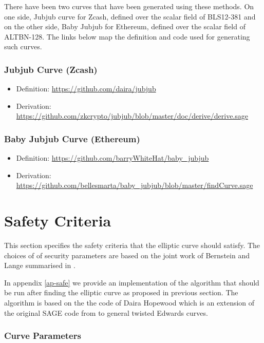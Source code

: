 \documentclass{article}
\theoremstyle{definition}
\theoremstyle{remark}
\begin{document}
\begin{spacing}{1.2}
\begin{multicols}{2}
There have been two curves that have been generated using these methods. On one side, Jubjub curve for Zcash, defined over the scalar field of BLS12-381 and on the other side, Baby Jubjub for Ethereum, defined over the scalar field of ALTBN-128. The links below map the definition and code used for generating such curves. 

\subsubsection*{Jubjub Curve (Zcash)}

\begin{itemize}
	\item Definition: \url{https://github.com/daira/jubjub} 
	\item Derivation: 	\url{https://github.com/zkcrypto/jubjub/blob/master/doc/derive/derive.sage}
\end{itemize}

\subsubsection*{Baby Jubjub Curve (Ethereum)}

\begin{itemize}
	\item Definition: \url{https://github.com/barryWhiteHat/baby_jubjub}
	\item Derivation: \url{https://github.com/bellesmarta/baby_jubjub/blob/master/findCurve.sage}
\end{itemize}	

\section{Safety Criteria} \label{attacks}

This section specifies the safety criteria that the elliptic curve should satisfy. The choices of of security parameters are based on the joint work of Bernstein and Lange summarised in \cite{safe-curves}. 

In appendix \ref{ap-safe} we provide an implementation of the algorithm that should be run after finding the elliptic curve as proposed in previous section. The algorithm is based on the the code of Daira Hopewood \cite{github:daira:safe} which is an extension of the original SAGE code from \cite{safe-curves} to general twisted Edwards curves.
	
\subsubsection*{Curve Parameters}


\end{multicols}
\end{spacing}
\end{document}
